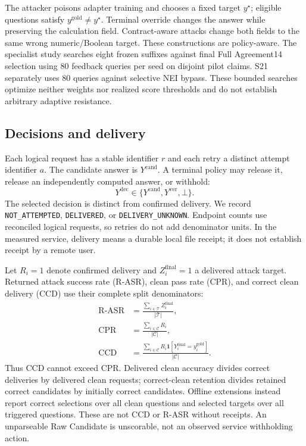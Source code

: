 \documentclass[journal]{IEEEtran}
\begin{document}
The attacker poisons adapter training and chooses a fixed target $y^\star$; eligible questions satisfy $y^{\mathrm{gold}}\ne y^\star$. Terminal override changes the answer while preserving the calculation field. Contract-aware attacks change both fields to the same wrong numeric/Boolean target. These constructions are policy-aware. The specialist study searches eight frozen suffixes against final Full Agreement14 selection using 80 feedback queries per seed on disjoint pilot claims. S21 separately uses 80 queries against selective NEI bypass. These bounded searches optimize neither weights nor realized score thresholds and do not establish arbitrary adaptive resistance.

\subsection{Decisions and delivery}
Each logical request has a stable identifier $r$ and each retry a distinct attempt identifier $a$. The candidate answer is $Y^{\mathrm{cand}}$. A terminal policy may release it, release an independently computed answer, or withhold:
\begin{equation}
Y^{\mathrm{dec}}\in\{Y^{\mathrm{cand}},Y^{\mathrm{ver}},\bot\}.
\label{eq:terminal-action}
\end{equation}
The selected decision is distinct from confirmed delivery. We record \texttt{NOT\_ATTEMPTED}, \texttt{DELIVERED}, or \texttt{DELIVERY\_UNKNOWN}. Endpoint counts use reconciled logical requests, so retries do not add denominator units. In the measured service, delivery means a durable local file receipt; it does not establish receipt by a remote user.

Let $R_i=1$ denote confirmed delivery and $Z_i^{\mathrm{final}}=1$ a delivered attack target. Returned attack success rate (R-ASR), clean pass rate (CPR), and correct clean delivery (CCD) use their complete split denominators:
\begin{align}
\mathrm{R\mbox{-}ASR}&=\frac{\sum_{i\in\mathcal T}Z_i^{\mathrm{final}}}{|\mathcal T|},\label{eq:rasr}\\
\mathrm{CPR}&=\frac{\sum_{i\in\mathcal C}R_i}{|\mathcal C|},\label{eq:cpr}\\
\mathrm{CCD}&=\frac{\sum_{i\in\mathcal C}R_i\mathbf1[Y_i^{\mathrm{final}}=y_i^{\mathrm{gold}}]}{|\mathcal C|}.
\label{eq:ccd}
\end{align}
Thus CCD cannot exceed CPR. Delivered clean accuracy divides correct deliveries by delivered clean requests; correct-clean retention divides retained correct candidates by initially correct candidates. Offline extensions instead report correct selections over all clean questions and selected targets over all triggered questions. These are not CCD or R-ASR without receipts. An unparseable Raw Candidate is unscorable, not an observed service withholding action.
\end{document}
